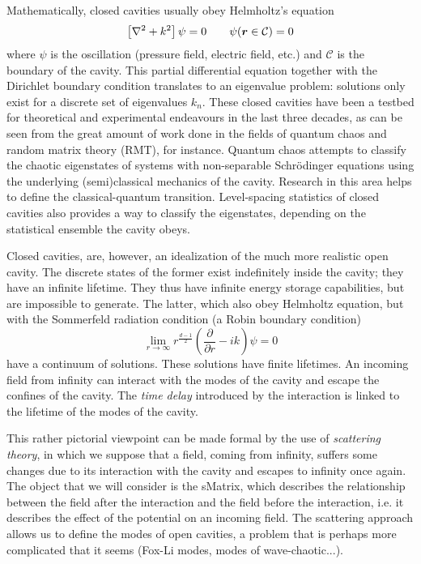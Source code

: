 Mathematically, closed cavities usually obey Helmholtz's equation
  \begin{equation}
   \left[\nabla^2+k^2\right]\psi=0\qquad \psi(\boldsymbol{r}\in\mathcal{C})=0
  \end{equation}
where $\psi$ is the oscillation (pressure field, electric field, etc.)
and $\mathcal{C}$ is the boundary of the cavity. This partial differential
equation together with the Dirichlet boundary condition translates to an
eigenvalue problem: solutions only exist for a discrete set of eigenvalues 
$k_n$. These closed cavities have been a testbed for theoretical
and experimental endeavours in the last three decades, as can be
seen from the great amount of work done in the fields of quantum 
chaos and random matrix theory (RMT), for instance. Quantum chaos attempts
to classify the chaotic eigenstates of systems with non-separable Schrödinger
equations using the underlying (semi)classical mechanics of the 
cavity. Research in this area helps to define the classical-quantum
transition. Level-spacing statistics of closed cavities also provides
a way to classify the eigenstates, depending on the statistical 
ensemble the cavity obeys. 

Closed cavities, are, however, an idealization of the much more
realistic open cavity. The discrete states of the former exist 
indefinitely inside the cavity; they have an infinite lifetime. 
They thus have infinite energy storage capabilities, but are impossible 
to generate. The latter, which also obey Helmholtz equation, but with the 
Sommerfeld radiation condition (a Robin boundary condition)
  \begin{equation}
   \lim_{r\rightarrow\infty}r^{\frac{d-1}{2}}\left(\frac{\partial}{\partial r}-ik\right)\psi=0
  \end{equation}
have a continuum of solutions. These solutions have finite lifetimes.
An incoming field from infinity can interact with the modes of the
cavity and escape the confines of the cavity. The \textit{time delay} introduced
by the interaction is linked to the lifetime of the modes of the cavity. 

This rather pictorial viewpoint can be made formal by the use of \textit{scattering theory}, 
in which we suppose that a field, coming from infinity, suffers some changes due to its
interaction with the cavity and escapes to infinity once again. The object that we will consider
is the \gls{sMatrix}, which describes the relationship between the field after the interaction
and the field before the interaction, i.e. it describes the effect of the potential
on an incoming field. The scattering approach allows us to define the modes of 
open cavities, a problem that is perhaps more complicated that it seems \cite{DUT2000,DUT2001,TUR2005} (Fox-Li modes, modes of
wave-chaotic...). 

